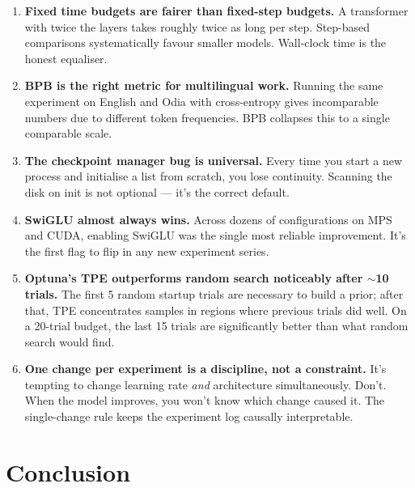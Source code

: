 \documentclass[12pt, a4paper]{article}
\begin{document}
\begin{enumerate}[leftmargin=*, itemsep=4pt]

  \item \textbf{Fixed time budgets are fairer than fixed-step budgets.}
  A transformer with twice the layers takes roughly twice as long per step. Step-based
  comparisons systematically favour smaller models. Wall-clock time is the honest equaliser.

  \item \textbf{BPB is the right metric for multilingual work.}
  Running the same experiment on English and Odia with cross-entropy gives incomparable
  numbers due to different token frequencies. BPB collapses this to a single comparable scale.

  \item \textbf{The checkpoint manager bug is universal.}
  Every time you start a new process and initialise a list from scratch, you lose continuity.
  Scanning the disk on init is not optional — it's the correct default.

  \item \textbf{SwiGLU almost always wins.}
  Across dozens of configurations on MPS and CUDA, enabling SwiGLU was the single most
  reliable improvement. It's the first flag to flip in any new experiment series.

  \item \textbf{Optuna's TPE outperforms random search noticeably after $\sim$10 trials.}
  The first 5 random startup trials are necessary to build a prior; after that, TPE
  concentrates samples in regions where previous trials did well. On a 20-trial budget,
  the last 15 trials are significantly better than what random search would find.

  \item \textbf{One change per experiment is a discipline, not a constraint.}
  It's tempting to change learning rate \emph{and} architecture simultaneously. Don't.
  When the model improves, you won't know which change caused it. The single-change rule
  keeps the experiment log causally interpretable.

\end{enumerate}

\section{Conclusion}
\end{document}
